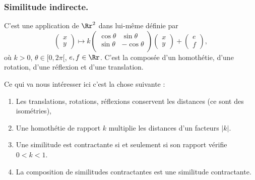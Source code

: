 \documentclass[11pt,class=report,crop=false]{standalone}
\newcommand{\myvec}[2]{\begin{pmatrix}#1 \\ #2\end{pmatrix}}
\begin{document}
\subsubsection*{Similitude indirecte.}
C'est une application de $\Rr^2$ dans lui-même définie 
par
$$\myvec{x}{y} \mapsto k\begin{pmatrix}\cos \theta & \sin \theta \\ 
\sin\theta & -\cos \theta\\ \end{pmatrix}\myvec{x}{y} + \myvec{e}{f},$$
où $k > 0$, $\theta \in[0,2\pi[$, $e, f \in \Rr$.
C'est la composée d'un homothétie, d'une rotation, d'une réflexion et d'une translation.




Ce qui va nous intéresser ici c'est la chose suivante :
\begin{proposition}
\sauteligne
\begin{enumerate}
 \item Les translations, rotations, réflexions conservent les distances (ce sont des isométries),
 \item Une homothétie de rapport $k$ multiplie les distances d'un facteurs $|k|$.
 \item Une similitude est contractante si et seulement si son rapport 
vérifie $0 < k < 1$.
 \item La composition de similitudes contractantes est une similitude contractante.
\end{enumerate}
\end{proposition}
\end{document}
